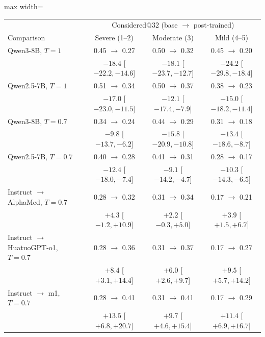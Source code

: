 \documentclass[wcp]{jmlr}
\begin{document}
\begin{table}[t]
\centering\small
\begin{adjustbox}{max width=\linewidth}
\begin{tabular}{lccc}
\toprule
 & \multicolumn{3}{c}{Considered@32 (base $\rightarrow$ post-trained)} \\
Comparison & Severe (1--2) & Moderate (3) & Mild (4--5) \\
\midrule
Qwen3-8B, $T{=}1$ & 0.45 $\rightarrow$ 0.27 & 0.50 $\rightarrow$ 0.32 & 0.45 $\rightarrow$ 0.20 \\
 & \footnotesize{$-18.4$ [$-22.2,-14.6$]} & \footnotesize{$-18.1$ [$-23.7,-12.7$]} & \footnotesize{$-24.2$ [$-29.8,-18.4$]} \\
Qwen2.5-7B, $T{=}1$ & 0.51 $\rightarrow$ 0.34 & 0.50 $\rightarrow$ 0.37 & 0.38 $\rightarrow$ 0.23 \\
 & \footnotesize{$-17.0$ [$-23.0,-11.5$]} & \footnotesize{$-12.1$ [$-17.4,-7.9$]} & \footnotesize{$-15.0$ [$-18.2,-11.4$]} \\
Qwen3-8B, $T{=}0.7$ & 0.34 $\rightarrow$ 0.24 & 0.44 $\rightarrow$ 0.29 & 0.31 $\rightarrow$ 0.18 \\
 & \footnotesize{$-9.8$ [$-13.7,-6.2$]} & \footnotesize{$-15.8$ [$-20.9,-10.8$]} & \footnotesize{$-13.4$ [$-18.6,-8.7$]} \\
Qwen2.5-7B, $T{=}0.7$ & 0.40 $\rightarrow$ 0.28 & 0.41 $\rightarrow$ 0.31 & 0.28 $\rightarrow$ 0.17 \\
 & \footnotesize{$-12.4$ [$-18.0,-7.4$]} & \footnotesize{$-9.1$ [$-14.2,-4.7$]} & \footnotesize{$-10.3$ [$-14.3,-6.5$]} \\
\midrule
Instruct $\rightarrow$ AlphaMed, $T{=}0.7$ & 0.28 $\rightarrow$ 0.32 & 0.31 $\rightarrow$ 0.34 & 0.17 $\rightarrow$ 0.21 \\
 & \footnotesize{$+4.3$ [$-1.2,+10.9$]} & \footnotesize{$+2.2$ [$-0.3,+5.0$]} & \footnotesize{$+3.9$ [$+1.5,+6.7$]} \\
Instruct $\rightarrow$ HuatuoGPT-o1, $T{=}0.7$ & 0.28 $\rightarrow$ 0.36 & 0.31 $\rightarrow$ 0.37 & 0.17 $\rightarrow$ 0.27 \\
 & \footnotesize{$+8.4$ [$+3.1,+14.4$]} & \footnotesize{$+6.0$ [$+2.6,+9.7$]} & \footnotesize{$+9.5$ [$+5.7,+14.2$]} \\
Instruct $\rightarrow$ m1, $T{=}0.7$ & 0.28 $\rightarrow$ 0.41 & 0.31 $\rightarrow$ 0.41 & 0.17 $\rightarrow$ 0.29 \\
 & \footnotesize{$+13.5$ [$+6.8,+20.7$]} & \footnotesize{$+9.7$ [$+4.6,+15.4$]} & \footnotesize{$+11.4$ [$+6.9,+16.7$]} \\

\end{tabular}
\end{adjustbox}
\end{table}
\end{document}
